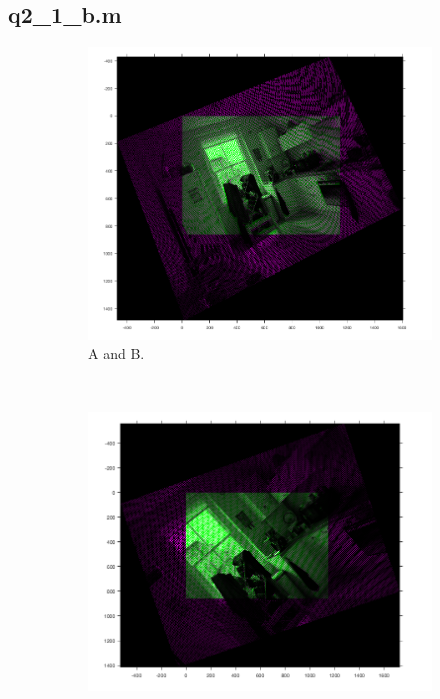 \documentclass[a4paper, 10pt, conference]{ieeeconf}
\begin{document}

\newpage

\subsection*{q2\_1\_b.m}

\begin{figure}[!ht]
  \captionsetup[subfigure]{position=b}
  \centering
    \begin{subfigure}{0.3\linewidth}
      \includegraphics[width=\textwidth]{pic/q2_1_b1_AB_pair}
      \caption{A and B.}
    \end{subfigure}
    ~
    \begin{subfigure}{0.3\linewidth}
      \includegraphics[width=\textwidth]{pic/q2_1_b1_BC_pair}

\end{subfigure}
\end{figure}
\end{document}
